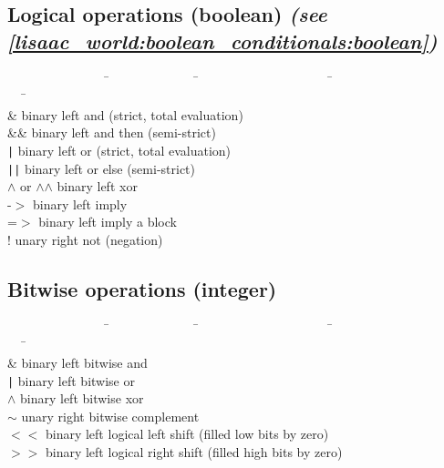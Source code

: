\documentclass[11pt]{mybook}
\begin{document}
\subsection{Logical operations (\sc{}boolean) {\it{}(see \ref{lisaac_world:boolean_conditionals:boolean})}}
\label{lisaac_world:glossary:logical_operations}
\begin{tabbing}
~~~~~~~~~~~~~~~~\=~~~~~~~~~~~~~~\=~~~~~~~~~~~~~~~~~~~~~\=~~~~~~~~~~~~~~~~~~~~~~~~\=\kill\\
{\&}            \> binary \>left  \> {and (strict, total evaluation)}    \\
{\&\&}          \> binary \>left  \> {and then (semi-strict)}            \\
{\tt |}         \> binary \>left  \> {or (strict, total evaluation)}     \\
{\tt ||}        \> binary \>left  \> {or else (semi-strict)}             \\
{$\wedge$ or $\wedge$$\wedge$} \> binary \>left  \> {xor}                \\
{-$>$}          \> binary \>left  \> {imply}                             \\
{=$>$}          \> binary \>left  \> {imply a block}                     \\
{!}             \> unary  \>right \> {not (negation)}                    \\
\end{tabbing}
\subsection{Bitwise operations (\sc{}integer)}
\label{lisaac_world:glossary:bitwise_operations}
\begin{tabbing}
~~~~~~~~~~~~~~~~\=~~~~~~~~~~~~~~\=~~~~~~~~~~~~~~~~~~~~~\=~~~~~~~~~~~~~~~~~~~~~~~~\=\kill\\
{\&}            \> binary \>left  \> {bitwise and}                   \\
{\tt |}         \> binary \>left  \> {bitwise or}                    \\
{$\wedge$}      \> binary \>left  \> {bitwise xor}                   \\
{$\sim$}        \> unary  \>right \> {bitwise complement}            \\
{$<<$}          \> binary \>left  \> {logical left shift (filled low bits by zero)} \\
{$>>$}          \> binary \>left  \> {logical right shift (filled high bits by zero)}   \\
\end{tabbing}
\end{document}
